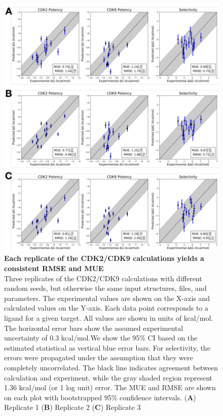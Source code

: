 \documentclass[9pt,lineno]{elife-modified} %
\begin{document}
\begin{figure}[h]
\begin{fullwidth}
\begin{centering}
\includegraphics[width=1.0\linewidth]{figures/supp_figure4.pdf}
\end{centering}
\caption{
\label{fig:sup-figure-4}
{\bf Each replicate of the CDK2/CDK9 calculations yields a consistent RMSE and MUE} \\
Three replicates of the CDK2/CDK9 calculations with different random seeds, but otherwise the same input structures, files, and parameters. The experimental values are shown on the X-axis and calculated values on the Y-axis. Each data point corresponds to a ligand for a given target. All values are shown in units of kcal/mol. The horizontal error bars show the assumed experimental uncertainty of 0.3 kcal/mol\citep{BROWN2009420}.We show the 95\% CI based on the estimated statistical as vertical blue error bars. For selectivity, the errors were propagated under the assumption that they were completely uncorrelated. The black line indicates agreement between calculation and experiment, while the gray shaded region represent 1.36 kcal/mol (or 1 log unit) error. The MUE and RMSE are shown on each plot with bootstrapped 95$\%$ confidence intervals. ({\bf A}) Replicate 1 ({\bf B}) Replicate 2 ({\bf C}) Replicate 3}

\end{fullwidth}
\end{figure}
\end{document}
